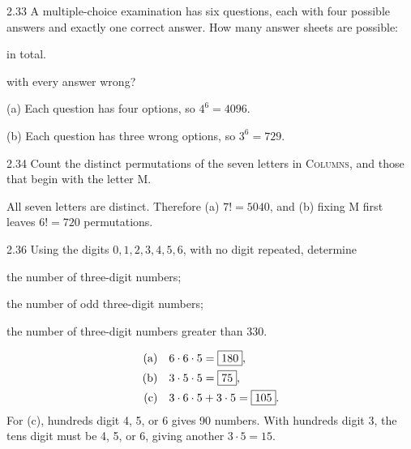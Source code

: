 \documentclass[11pt,oneside]{article}
\begin{document}
\begin{exercise}{2.33}
A multiple-choice examination has six questions, each with four possible answers and exactly one correct answer. How many answer sheets are possible:
\begin{exercisesubparts}
\item in total.
\item with every answer wrong?
\end{exercisesubparts}
\end{exercise}

\begin{solution}
\textup{(a)} Each question has four options, so $4^6=\boxed{4096}$.\par\medskip
\noindent\textup{(b)} Each question has three wrong options, so $3^6=\boxed{729}$.
\end{solution}

\begin{exercise}{2.34}
Count the distinct permutations of the seven letters in \textsc{Columns}, and those that begin with the letter M.
\end{exercise}

\begin{solution}
All seven letters are distinct. Therefore (a) $7!=\boxed{5040}$, and (b) fixing M first leaves $6!=\boxed{720}$ permutations.
\end{solution}

\begin{exercise}{2.36}
Using the digits $0,1,2,3,4,5,6$, with no digit repeated, determine
\par
\begin{exercisesubparts}
\item the number of three-digit numbers;
\item the number of odd three-digit numbers;
\item the number of three-digit numbers greater than 330.
\end{exercisesubparts}
\end{exercise}

\begin{solution}
\begin{align*}
\textup{(a)}\quad&6\cdot6\cdot5=\boxed{180},\\
\textup{(b)}\quad&3\cdot5\cdot5=\boxed{75},\\
\textup{(c)}\quad&3\cdot6\cdot5+3\cdot5=\boxed{105}.
\end{align*}
For (c), hundreds digit 4, 5, or 6 gives 90 numbers. With hundreds digit 3, the tens digit must be 4, 5, or 6, giving another $3\cdot5=15$.
\end{solution}
\end{document}
